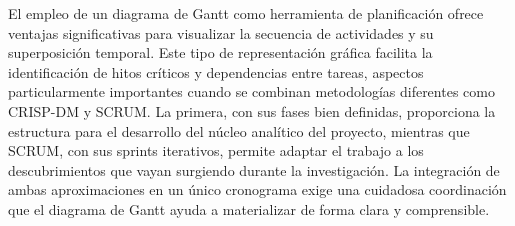 El empleo de un diagrama de Gantt como herramienta de planificación ofrece ventajas significativas para visualizar la secuencia de actividades y su superposición temporal. Este tipo de representación gráfica facilita la identificación de hitos críticos y dependencias entre tareas, aspectos particularmente importantes cuando se combinan metodologías diferentes como CRISP-DM y SCRUM. La primera, con sus fases bien definidas, proporciona la estructura para el desarrollo del núcleo analítico del proyecto, mientras que SCRUM, con sus sprints iterativos, permite adaptar el trabajo a los descubrimientos que vayan surgiendo durante la investigación. La integración de ambas aproximaciones en un único cronograma exige una cuidadosa coordinación que el diagrama de Gantt ayuda a materializar de forma clara y comprensible.



